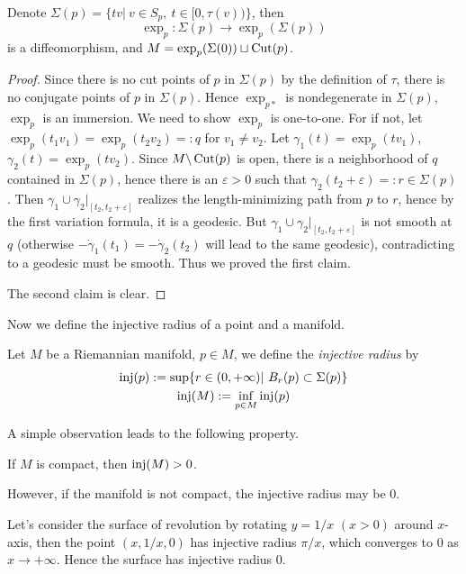 \begin{prop}
    Denote $\Sigma(p)=\{tv|\ v\in S_p,\ t\in[0,\tau(v))\}$, then
    \[\exp_p:\Sigma(p)\to\exp_p(\Sigma(p))\]
    is a diffeomorphism, and $M=\exp_p(\Sigma(0))\sqcup\operatorname{Cut}(p)$.
\end{prop}
\begin{proof}
    Since there is no cut points of $p$ in $\Sigma(p)$ by the definition of $\tau$, there is no conjugate points of $p$ in $\Sigma(p)$.
    Hence $\exp_{p*}$ is nondegenerate in $\Sigma(p)$, $\exp_{p}$ is an immersion.
    We need to show $\exp_p$ is one-to-one.
    For if not, let $\exp_p(t_1v_1)=\exp_p(t_2v_2)=:q$ for $v_1\neq v_2$.
    Let $\gamma_1(t)=\exp_p(tv_1)$, $\gamma_2(t)=\exp_p(tv_2)$.
    Since $M\backslash\operatorname{Cut}(p)$ is open, there is a neighborhood of $q$ contained in $\Sigma(p)$, hence there is an $\varepsilon>0$ such that $\gamma_2(t_2+\varepsilon)=:r\in\Sigma(p)$.
    Then $\gamma_1\cup\gamma_2|_{[t_2,t_2+\varepsilon]}$ realizes the length-minimizing path from $p$ to $r$, hence by the first variation formula, it is a geodesic.
    But $\gamma_1\cup\gamma_2|_{[t_2,t_2+\varepsilon]}$ is not smooth at $q$ (otherwise $-\dot{\gamma}_1(t_1)=-\dot{\gamma}_2(t_2)$ will lead to the same geodesic), contradicting to a geodesic must be smooth.
    Thus we proved the first claim.

    The second claim is clear.
\end{proof}

Now we define the injective radius of a point and a manifold.
\begin{defn}
    Let $M$ be a Riemannian manifold, $p\in M$, we define the \emph{injective radius} by
    \begin{gather*}
        \operatorname{inj}(p):=\sup\{r\in(0,+\infty)|\ B_r(p)\subset\Sigma(p)\}\\
        \operatorname{inj}(M):=\inf_{p\in M}\operatorname{inj}(p)
    \end{gather*}
\end{defn}

A simple observation leads to the following property.
\begin{prop}
    If $M$ is compact, then $\operatorname{inj}(M)>0$.
\end{prop}

However, if the manifold is not compact, the injective radius may be $0$.
\begin{eg}
    Let's consider the surface of revolution by rotating $y=1/x$ $(x>0)$ around $x$-axis, then the point $(x,1/x,0)$ has injective radius $\pi/x$, which converges to $0$ as $x\to+\infty$.
    Hence the surface has injective radius $0$.
\end{eg}

